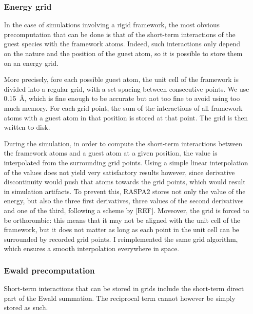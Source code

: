 \documentclass[main.tex]{subfiles}
\begin{document}
\subsubsection{Energy grid}

In the case of simulations involving a rigid framework, the most obvious precomputation that can be done is that of the short-term interactions of the guest species with the framework atoms. Indeed, such interactions only depend on the nature and the position of the guest atom, so it is possible to store them on an energy grid.

More precisely, fore each possible guest atom, the unit cell of the framework is divided into a regular grid, with a set spacing between consecutive points. We use \qty{0.15}{\angstrom}, which is fine enough to be accurate but not too fine to avoid using too much memory. For each grid point, the sum of the interactions of all framework atoms with a guest atom in that position is stored at that point. The grid is then written to disk.

During the simulation, in order to compute the short-term interactions between the framework atoms and a guest atom at a given position, the value is interpolated from the surrounding grid points. Using a simple linear interpolation of the values does not yield very satisfactory results however, since derivative discontinuity would push that atoms towards the grid points, which would result in simulation artifacts. To prevent this, RASPA2 stores not only the value of the energy, but also the three first derivatives, three values of the second derivatives and one of the third, following a scheme by [REF]. Moveover, the grid is forced to be orthorombic: this means that it may not be aligned with the unit cell of the framework, but it does not matter as long as each point in the unit cell can be surrounded by recorded grid points. I reimplemented the same grid algorithm, which ensures a smooth interpolation everywhere in space.

\subsubsection{Ewald precomputation}

Short-term interactions that can be stored in grids include the short-term direct part of the Ewald summation. The reciprocal term cannot however be simply stored as such.
\end{document}

